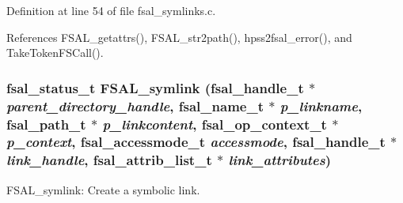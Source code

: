 Definition at line 54 of file fsal\_\-symlinks.c.

References FSAL\_\-getattrs(), FSAL\_\-str2path(), hpss2fsal\_\-error(), and TakeTokenFSCall().
\subsubsection[{FSAL\_\-symlink}]{\setlength{\rightskip}{0pt plus 5cm}fsal\_\-status\_\-t FSAL\_\-symlink (fsal\_\-handle\_\-t $\ast$ {\em parent\_\-directory\_\-handle}, \/  fsal\_\-name\_\-t $\ast$ {\em p\_\-linkname}, \/  fsal\_\-path\_\-t $\ast$ {\em p\_\-linkcontent}, \/  fsal\_\-op\_\-context\_\-t $\ast$ {\em p\_\-context}, \/  fsal\_\-accessmode\_\-t {\em accessmode}, \/  fsal\_\-handle\_\-t $\ast$ {\em link\_\-handle}, \/  fsal\_\-attrib\_\-list\_\-t $\ast$ {\em link\_\-attributes})}\label{fsal__symlinks_8c_a2469936f37f8fadfe8af38349461ecf}


FSAL\_\-symlink: Create a symbolic link.

